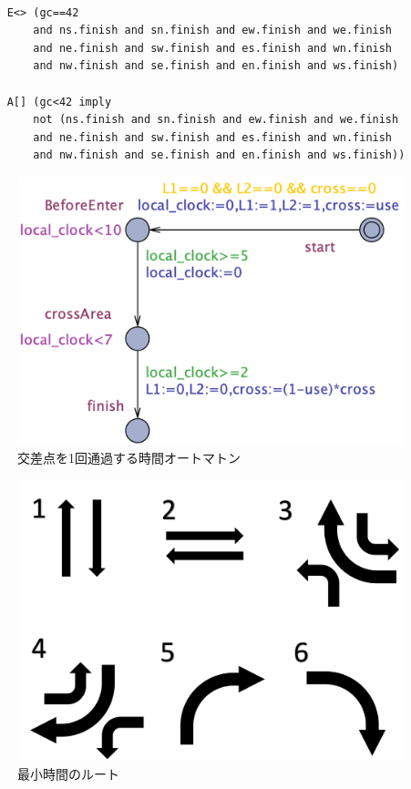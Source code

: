 \documentclass{tpu-sotu}
\begin{document}
	
	\begin{verbatim}
	
	E<> (gc==42 
		and ns.finish and sn.finish and ew.finish and we.finish 
		and ne.finish and sw.finish and es.finish and wn.finish 
		and nw.finish and se.finish and en.finish and ws.finish)
	
	A[] (gc<42 imply 
		not (ns.finish and sn.finish and ew.finish and we.finish 
		and ne.finish and sw.finish and es.finish and wn.finish 
		and nw.finish and se.finish and en.finish and ws.finish))
	\end{verbatim}
	\begin{figure}[htbp]
	\centering
	\includegraphics[width=130mm]{minTime.png}
	\caption{交差点を1回通過する時間オートマトン}
	\label{minT}
	\end{figure}
	\begin{figure}[htbp]
	\centering
	\includegraphics[width=130mm]{veriT.png}
	\caption{最小時間のルート}
	\label{veriT}
	\end{figure}
\end{document}
